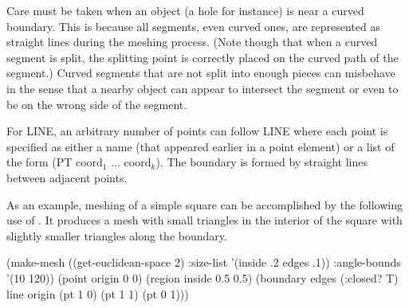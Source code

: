 Care must be taken when an object (a hole for instance) is near a
curved boundary.  This is because all segments, even curved ones, are
represented as straight lines during the meshing process.  (Note
though that when a curved segment is split, the splitting point is
correctly placed on the curved path of the segment.)  Curved segments
that are not split into enough pieces can misbehave in the sense that
a nearby object can appear to intersect the segment or even to be on
the wrong side of the segment.

For {\sf LINE}, an arbitrary number of points can follow {\sf LINE} where
each point is specified as either a name (that appeared earlier in a
{\sf point} element) or a list of the form {\sf (PT coord$_1$ $\ldots$ coord$_k$)}.  The
boundary is formed by straight lines between adjacent points.

As an example, meshing of a simple square can be accomplished by the
following use of .  It produces a mesh with small
triangles in the interior of the square with slightly smaller
triangles along the boundary.

\begin{code}
(make-mesh ((get-euclidean-space 2) :size-list '(inside .2 edges .1))
                                    :angle-bounds '(10 120)) 
  (point origin 0 0) 
  (region inside 0.5 0.5)
  (boundary edges (:closed? T) line
    origin (pt 1 0) (pt 1 1) (pt 0 1)))
\end{code}

